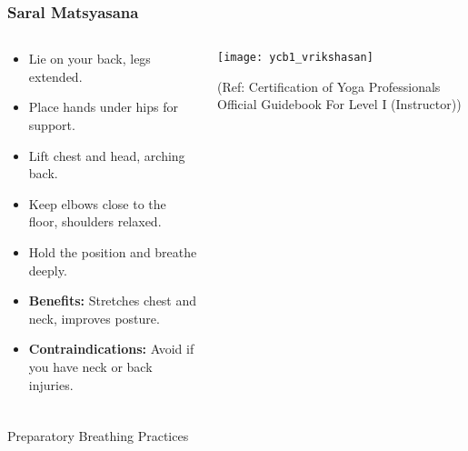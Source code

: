 \begin{frame}[fragile]\frametitle{Saral Matsyasana}
\begin{columns}
    \begin{column}[T]{0.5\linewidth}
      \begin{itemize}
        \item Lie on your back, legs extended.
        \item Place hands under hips for support.
        \item Lift chest and head, arching back.
        \item Keep elbows close to the floor, shoulders relaxed.
        \item Hold the position and breathe deeply.
        \item \textbf{Benefits:} Stretches chest and neck, improves posture.
        \item \textbf{Contraindications:} Avoid if you have neck or back injuries.
      \end{itemize}
    \end{column}
    \begin{column}[T]{0.5\linewidth}
        \begin{center}
        \begin{center}
		        \texttt{[image: ycb1\_vrikshasan]}
				
				{\tiny (Ref: Certification  of Yoga Professionals Official Guidebook For Level I (Instructor))}	        
		\end{center}   
        \end{center}    
    \end{column}
  \end{columns}
\end{frame}


\begin{frame}[fragile]\frametitle{}
\begin{center}
{\Large Preparatory Breathing Practices }
\end{center}
\end{frame}

